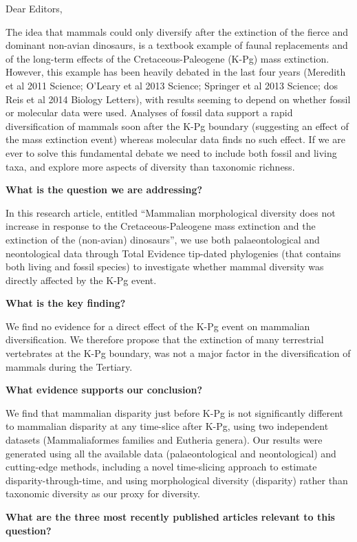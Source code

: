 \documentclass[11pt]{letter}
\begin{document}
\begin{letter}{}
\opening{Dear Editors,}

The idea that mammals could only diversify after the extinction of the fierce and dominant non-avian dinosaurs, is a textbook example of faunal replacements and of the long-term effects of the Cretaceous-Paleogene (K-Pg) mass extinction.
However, this example has been heavily debated in the last four years (Meredith et al 2011 Science; O'Leary et al 2013 Science; Springer et al 2013 Science; dos Reis et al 2014 Biology Letters), with results seeming to depend on whether fossil or molecular data were used.
Analyses of fossil data support a rapid diversification of mammals soon after the K-Pg boundary (suggesting an effect of the mass extinction event) whereas molecular data finds no such effect.
If we are ever to solve this fundamental debate we need to include both fossil and living taxa, and explore more aspects of diversity than taxonomic richness.

\textbf{What is the question we are addressing?}

In this research article, entitled ``Mammalian morphological diversity does not increase in response to the Cretaceous-Paleogene mass extinction and the extinction of the (non-avian) dinosaurs'', we use both palaeontological and neontological data through Total Evidence tip-dated phylogenies (that contains both living and fossil species) to investigate whether mammal diversity was directly affected by the K-Pg event.

\textbf{What is the key finding?}

We find no evidence for a direct effect of the K-Pg event on mammalian diversification.
We therefore propose that the extinction of many terrestrial vertebrates at the K-Pg boundary, was not a major factor in the diversification of mammals during the Tertiary. 

\textbf{What evidence supports our conclusion?}

We find that mammalian disparity just before K-Pg is not significantly different to mammalian disparity at any time-slice after K-Pg, using two independent datasets (Mammaliaformes families and Eutheria genera).
Our results were generated using all the available data (palaeontological and neontological) and cutting-edge methods, including a novel time-slicing approach to estimate disparity-through-time, and using morphological diversity (disparity) rather than taxonomic diversity as our proxy for diversity.

\textbf{What are the three most recently published articles relevant to this question?}


\end{letter}
\end{document}
